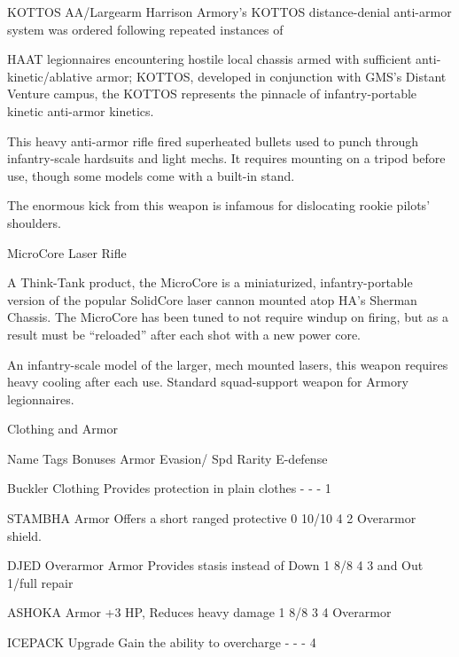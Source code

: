 KOTTOS AA/Largearm
Harrison Armory’s KOTTOS distance-denial anti-armor system was ordered following repeated instances of

HAAT legionnaires encountering hostile local chassis armed with sufficient anti-kinetic/ablative armor;
KOTTOS, developed in conjunction with GMS’s Distant Venture campus, the KOTTOS represents the
pinnacle of infantry-portable kinetic anti-armor kinetics.

This heavy anti-armor rifle fired superheated bullets used to punch through infantry-scale hardsuits and
light mechs. It requires mounting on a tripod before use, though some models come with a built-in stand.

The enormous kick from this weapon is infamous for dislocating rookie pilots’ shoulders.


MicroCore Laser Rifle




A Think-Tank product, the MicroCore is a miniaturized, infantry-portable version of the popular SolidCore
laser cannon mounted atop HA’s Sherman Chassis. The MicroCore has been tuned to not require windup
on firing, but as a result must be “reloaded” after each shot with a new power core.

An infantry-scale model of the larger, mech mounted lasers, this weapon requires heavy cooling after each
use. Standard squad-support weapon for Armory legionnaires.


                                                 Clothing and Armor

  Name                  Tags        Bonuses                                    Armor      Evasion/       Spd    Rarity
                                                                                          E-defense

 Buckler                Clothing    Provides protection in plain clothes       -          -              -      1

 STAMBHA               Armor        Offers a short ranged protective            0          10/10          4      2
  Overarmor                         shield.

 DJED Overarmor    Armor            Provides stasis instead of Down            1          8/8            4      3
                                    and Out 1/full repair

 ASHOKA                Armor        +3 HP, Reduces heavy damage                1          8/8            3      4
  Overarmor

 ICEPACK                Upgrade     Gain the ability to overcharge             -          -              -      4

